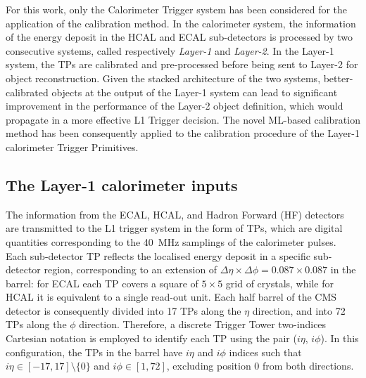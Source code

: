For this work, only the Calorimeter Trigger system has been considered for the application of the calibration method. In the calorimeter system, the information of the energy deposit in the HCAL and ECAL sub-detectors is processed by two consecutive systems, called respectively \textit{Layer-1} and \textit{Layer-2}. In the Layer-1 system, the TPs are calibrated and pre-processed before being sent to Layer-2 for object reconstruction. Given the stacked architecture of the two systems, better-calibrated objects at the output of the Layer-1 system can lead to significant improvement in the performance of the Layer-2 object definition, which would propagate in a more effective L1 Trigger decision.
The novel ML-based calibration method has been consequently applied to the calibration procedure of the Layer-1 calorimeter Trigger Primitives.

\subsection{The Layer-1 calorimeter inputs}
\label{subsec:The Layer-1 calorimeter inputs}

The information from the ECAL, HCAL, and Hadron Forward (HF) detectors are transmitted to the L1 trigger system in the form of TPs, which are digital quantities corresponding to the 40~MHz samplings of the calorimeter pulses. Each sub-detector TP reflects the localised energy deposit in a specific sub-detector region, corresponding to an extension of $\Delta\eta\times\Delta\phi = 0.087 \times 0.087$ in the barrel: for ECAL each TP covers a square of $5\times5$ grid of crystals, while for HCAL it is equivalent to a single read-out unit.
Each half barrel of the CMS detector is consequently divided into 17 TPs along the $\eta$ direction, and into 72 TPs along the $\phi$ direction. Therefore, a discrete Trigger Tower two-indices Cartesian notation is employed to identify each TP using the pair ($i\eta$, $i\phi$). In this configuration, the TPs in the barrel have $i\eta$ and $i\phi$ indices such that $i\eta \in [-17,17] \setminus \{0\}$ and $i\phi \in [1,72]$, excluding position 0 from both directions.

